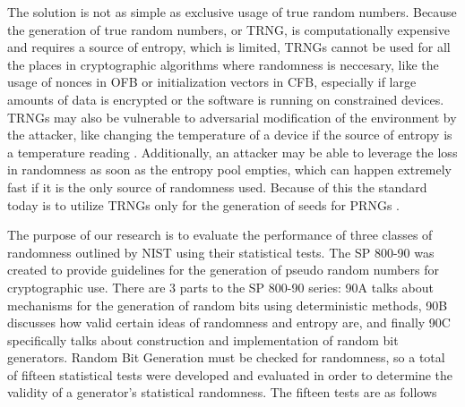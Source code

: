 \documentclass[11pt,letterpaper,conference]{IEEEtran}
\begin{document}
The solution is not as simple as exclusive usage of true random numbers. Because the generation of
true random numbers, or TRNG, is computationally expensive and requires a source of entropy, which
is limited, TRNGs cannot be used for all the places in cryptographic algorithms where randomness is
neccesary, like the usage of nonces in OFB or initialization vectors in CFB, especially if large amounts
of data is encrypted or the software is running on constrained devices. TRNGs may also be vulnerable to
adversarial modification of the environment by the attacker, like changing the temperature of a device
if the source of entropy is a temperature reading \cite{barak2003true}. Additionally, an attacker may
be able to leverage the loss in randomness as soon as the entropy pool empties, which can happen extremely
fast if it is the only source of randomness used. Because of this the standard today is to utilize TRNGs
only for the generation of seeds for PRNGs \cite{8276259}.

The purpose of our research is to evaluate the performance of three classes of randomness outlined by NIST
using their statistical tests. The SP 800-90 was created to provide guidelines for
the generation of pseudo random numbers for cryptographic use. There are 3 parts to the SP 800-90 series:
90A talks about mechanisms for the generation of random bits using deterministic methods, 90B
discusses how valid certain ideas of randomness and entropy are, and finally 90C
specifically talks about construction and implementation of random bit generators. Random Bit
Generation must be checked for randomness, so a total of fifteen statistical tests were developed
and evaluated in order to determine the validity of a generator's statistical randomness. The fifteen
tests are as follows
\end{document}
